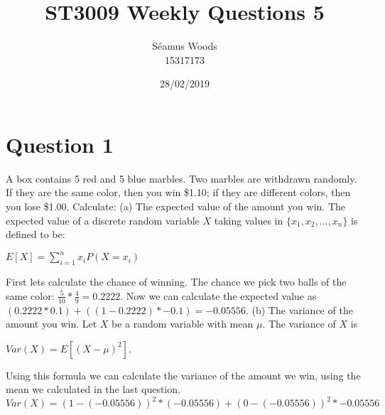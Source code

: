 \documentclass[12pt]{report}
\title{ST3009 Weekly Questions 5}
\author{Séamus Woods \\ 15317173}
\date{28/02/2019}
\begin{document}
\maketitle
\newpage

\section{Question 1}
A box contains 5 red and 5 blue marbles. Two marbles are withdrawn randomly. If they are the same color, then you win \$1.10; if they are different colors, then you lose \$1.00. Calculate:
\newline
\newline
(a) The expected value of the amount you win.
\newline
The expected value of a discrete random variable $X$ taking values in $\{x_1, x_2,...,x_n\}$ is defined to be:
\begin{center}
$E[X] = \sum\limits_{i=1}^n x_i P(X = x_i)$
\end{center}
First lets calculate the chance of winning. The chance we pick two balls of the same color: $\frac{5}{10} * \frac{4}{9} = 0.2222$. Now we can calculate the expected value as $(0.2222 * 0.1) + ((1-0.2222) * -0.1) = -0.05556$.
\newline
\newline
(b) The variance of the amount you win.
\newline
Let $X$ be a random variable with mean $\mu$. The variance of $X$ is 
\begin{center}
$Var(X) = E[(X - \mu)^2]$.
\end{center}
Using this formula we can calculate the variance of the amount we win, using the mean we calculated in the last question. $Var(X) = (1-(-0.05556))^2 * (-0.05556) + (0 - (-0.05556))^2 * -0.05556$
\end{document}
